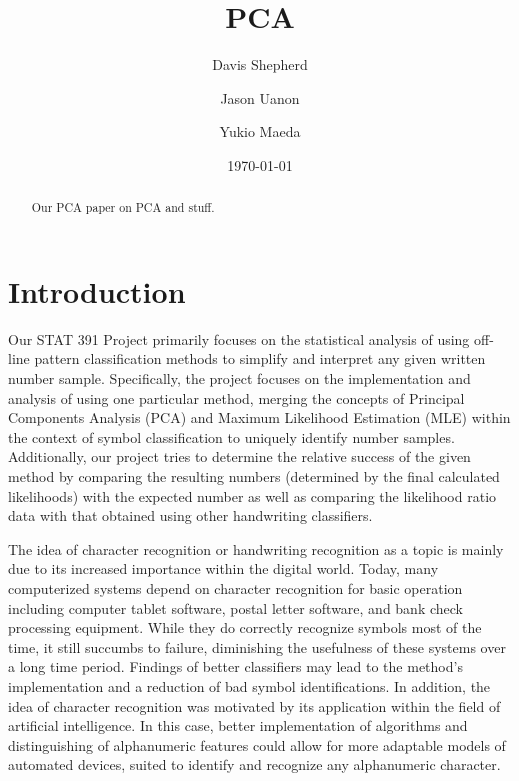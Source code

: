 \documentclass[twocolumn]{article}
\title{PCA}
\author{ Davis Shepherd \and Jason Uanon \and Yukio Maeda}
\date{\today}
\begin{document}
\ifpdf
{}
\else
{}
\fi

\maketitle


\begin{abstract}
    Our PCA paper on PCA and stuff.
\end{abstract}

\section{Introduction} %
\label{sec:introduction}
Our STAT 391 Project primarily focuses on the statistical analysis of using off-line pattern classification methods to simplify and interpret any given written number sample. Specifically, the project focuses on the implementation and analysis of using one particular method, merging the concepts of Principal Components Analysis (PCA) and Maximum Likelihood Estimation (MLE) within the context of symbol classification to uniquely identify number samples. Additionally, our project tries to determine the relative success of the given method by comparing the resulting numbers (determined by the final calculated likelihoods) with the expected number as well as comparing the likelihood ratio data with that obtained using other handwriting classifiers. 

The idea of character recognition or handwriting recognition as a topic is mainly due to its increased importance within the digital world. Today, many computerized systems depend on character recognition for basic operation including computer tablet software, postal letter software, and bank check processing equipment. While they do correctly recognize symbols most of the time, it still succumbs to failure, diminishing the usefulness of these systems over a long time period. Findings of better classifiers may lead to the method's implementation and a reduction of bad symbol identifications. In addition, the idea of character recognition was motivated by its application within the field of artificial intelligence. In this case, better implementation of algorithms and distinguishing of alphanumeric features could allow for more adaptable models of automated devices, suited to identify and recognize any alphanumeric character.
\end{document}
